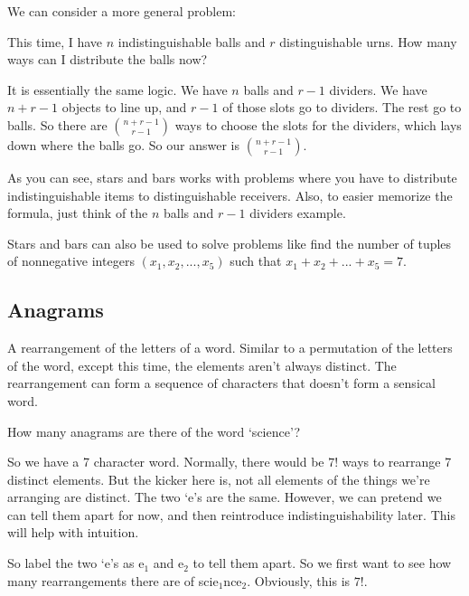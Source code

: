 \documentclass[11pt]{scrartcl}
\begin{document}
We can consider a more general problem:
\begin{example}
    This time, I have $n$ indistinguishable balls and $r$ distinguishable urns. How many ways can I distribute the balls now?
\end{example}
It is essentially the same logic. We have $n$ balls and $r-1$ dividers. We have $n+r-1$ objects to line up, and $r-1$ of those slots go to dividers. The rest go to balls. So there are $\binom{n+r-1}{r-1}$ ways to choose the slots for the dividers, which lays down where the balls go. So our answer is $\binom{n+r-1}{r-1}$.

\begin{advice}
As you can see, stars and bars works with problems where you have to distribute indistinguishable items to distinguishable receivers. Also, to easier memorize the formula, just think of the $n$ balls and $r-1$ dividers example.
\end{advice}

Stars and bars can also be used to solve problems like find the number of tuples of nonnegative integers $(x_1, x_2, ..., x_5)$ such that $x_1 + x_2 + ... + x_5 = 7$.

\subsection{Anagrams}

\begin{definition}[Anagram]
    A rearrangement of the letters of a word. Similar to a permutation of the letters of the word, except this time, the elements aren't always distinct. The rearrangement can form a sequence of characters that doesn't form a sensical word.
\end{definition}

\begin{example}
    How many anagrams are there of the word `science'?
\end{example}
So we have a 7 character word. Normally, there would be $7!$ ways to rearrange 7 distinct elements. But the kicker here is, not all elements of the things we're arranging are distinct. The two `e's are the same. However, we can pretend we can tell them apart for now, and then reintroduce indistinguishability later. This will help with intuition.

So label the two `e's as $\text{e}_1$ and $\text{e}_2$ to tell them apart. So we first want to see how many rearrangements there are of sci$\text{e}_1$nc$\text{e}_2$. Obviously, this is $7!$.
\end{document}
